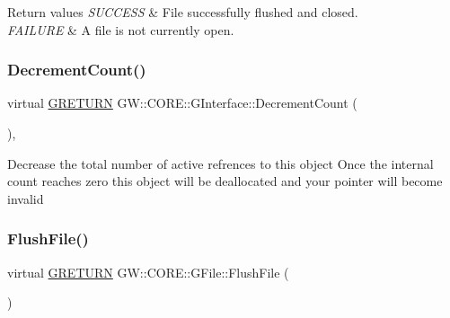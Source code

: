 \begin{DoxyRetVals}{Return values}
{\em S\+U\+C\+C\+E\+SS} & File successfully flushed and closed. \\
\hline
{\em F\+A\+I\+L\+U\+RE} & A file is not currently open. \\
\hline
\end{DoxyRetVals}
\hypertarget{class_g_w_1_1_c_o_r_e_1_1_g_interface_af6924e12b14f217b518fc91c63d9703d}{}\label{class_g_w_1_1_c_o_r_e_1_1_g_interface_af6924e12b14f217b518fc91c63d9703d} 
\subsubsection{\texorpdfstring{Decrement\+Count()}{DecrementCount()}}
{\footnotesize\ttfamily virtual \hyperlink{namespace_g_w_a69b1aaebac1cac8049825f035884c95b}{G\+R\+E\+T\+U\+RN} G\+W\+::\+C\+O\+R\+E\+::\+G\+Interface\+::\+Decrement\+Count (\begin{DoxyParamCaption}{ }\end{DoxyParamCaption})\hspace{0.3cm}{\ttfamily [pure virtual]}, {\ttfamily [inherited]}}

Decrease the total number of active refrences to this object Once the internal count reaches zero this object will be deallocated and your pointer will become invalid \hypertarget{class_g_w_1_1_c_o_r_e_1_1_g_file_a185d248041bf79161654a00ddb38c314}{}\label{class_g_w_1_1_c_o_r_e_1_1_g_file_a185d248041bf79161654a00ddb38c314} 
\subsubsection{\texorpdfstring{Flush\+File()}{FlushFile()}}
{\footnotesize\ttfamily virtual \hyperlink{namespace_g_w_a69b1aaebac1cac8049825f035884c95b}{G\+R\+E\+T\+U\+RN} G\+W\+::\+C\+O\+R\+E\+::\+G\+File\+::\+Flush\+File (\begin{DoxyParamCaption}{ }\end{DoxyParamCaption})\hspace{0.3cm}{\ttfamily [pure virtual]}}


